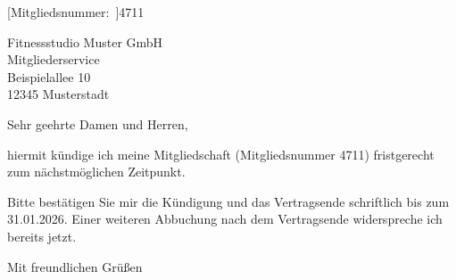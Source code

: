 

[Mitgliedsnummer:~]{4711}


\begin{letter}{%
    Fitnessstudio Muster GmbH\\
    Mitgliederservice\\
    Beispielallee 10\\
    12345 Musterstadt%
  }

  \opening{Sehr geehrte Damen und Herren,}

  hiermit kündige ich meine Mitgliedschaft (Mitgliedsnummer 4711) fristgerecht zum nächstmöglichen Zeitpunkt.

  Bitte bestätigen Sie mir die Kündigung und das Vertragsende schriftlich bis zum 31.01.2026. Einer weiteren Abbuchung nach dem Vertragsende widerspreche ich bereits jetzt.

  \closing{Mit freundlichen Grüßen}
\end{letter}

